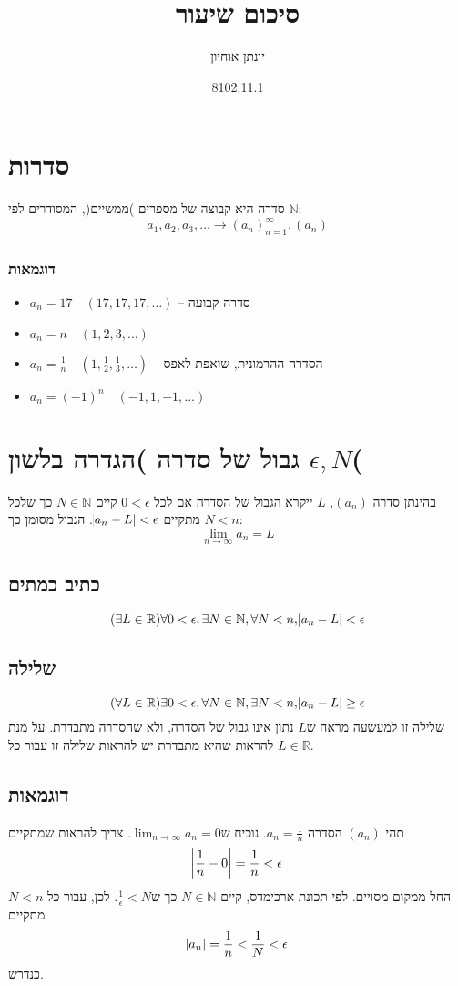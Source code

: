 \documentclass[11pt, oneside]{article}
\title{סיכום שיעור}
\author{יונתן אוחיון}
\date{8102.11.1}
\newcommand{\opr}[1]{\xrightarrow[\text{#1}]{}}
\newcommand{\mR}{\mathbb{R}}
\newcommand{\mN}{\mathbb{N}}
\begin{document}
\maketitle

\section{סדרות}
סדרה היא קבוצה של מספרים )ממשיים(, המסודרים לפי $\mN$:
\[
a_1, a_2, a_3, \dots \opr{} (a_n)^\infty_{n = 1}, (a_n)
\]

\subsubsection{דוגמאות}
\begin{itemize}
\item $a_n = 17\quad(17, 17, 17, \dots)$ -- סדרה קבועה
\item $a_n = n\quad(1, 2, 3, \dots)$
\item $a_n = \frac{1}{n}\quad(1, \frac{1}{2}, \frac{1}{3}, \dots)$ -- הסדרה ההרמונית, שואפת לאפס
\item $a_n = (-1)^n\quad(-1, 1, -1, \dots)$
\end{itemize}

\section{גבול של סדרה )הגדרה בלשון $\epsilon, N$(}
בהינתן סדרה $(a_n)$, $L$ ייקרא הגבול של הסדרה אם לכל $0 < \epsilon$ קיים $N \in \mN$ כך שלכל $N < n$ מתקיים $\abs{a_n - L} < \epsilon$. הגבול מסומן כך:
\[
\lim_{n \to \infty} a_n = L
\]

\subsection{כתיב כמתים}
\[
(\exists L \in \mR) \forall 0 < \epsilon, \exists N \in \mN, \forall N < n, \abs{a_n - L} < \epsilon
\]

\subsection{שלילה}
\[
(\forall L \in \mR) \exists 0 < \epsilon, \forall N \in \mN, \exists N < n, \abs{a_n - L} \ge \epsilon
\]
שלילה זו למעשעה מראה ש$L$ נתון אינו גבול של הסדרה, ולא שהסדרה מתבדרת. על מנת להראות שהיא מתבדרת יש להראות שלילה זו עבור כל $L \in \mR$.
\subsection{דוגמאות}
תהי $(a_n)$ הסדרה $a_n = \frac{1}{n}$. נוכיח ש$\lim_{n \to \infty} a_n = 0$. צריך להראות שמתקיים
\[
\abs{\frac{1}{n} - 0} = \frac{1}{n} < \epsilon
\]
החל ממקום מסויים. לפי תכונת ארכימדס, קיים $N \in \mN$ כך ש$\frac{1}{\epsilon} < N$. לכן, עבור כל $N < n$ מתקיים
\[
\abs{a_n} = \frac{1}{n} < \frac{1}{N} < \epsilon
\]
כנדרש.
\end{document}

